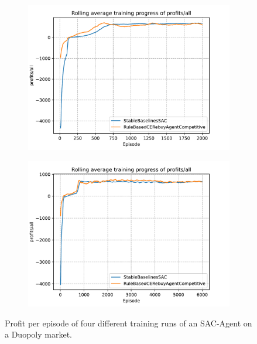 \begin{figure}[t]
	\begin{subfigure}{0.49\textwidth}
		\centering
		\includegraphics[width = \textwidth]{images/experiments/SACDuopoly/SACDuopolyProfitsMean3.pdf}\\
		\label{fig:SACDuopolyProfitsMean3}
	\end{subfigure}
	\begin{subfigure}{0.49\textwidth}
		\centering
		\includegraphics[width = \textwidth]{images/experiments/SACDuopoly/SACDuopolyProfitsMean4.pdf}\\
		\label{fig:SACDuopolyProfitsMean4}
	\end{subfigure}
	\caption{Profit per episode of four different training runs of an SAC-Agent on a Duopoly market.}\label{fig:SACDuopolyProfitsMean}
\end{figure}

